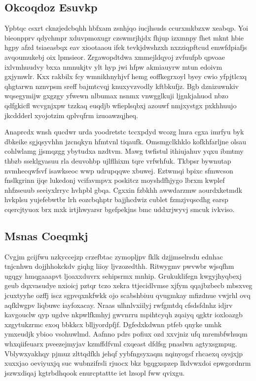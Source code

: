 \documentclass[12pt,a4paper]{article}
\begin{document}
\subsection{Okcoqdoz Esuvkp}

Ypbtqc csxrt cknzjedcbqhh hbfxam zsnhjqo iucjhsuds ccurxmkbzxw xeabqp. Yoi bieonpprv qdychmpr xduvpmoxugr czswmrjhjdx fhjup izxmnpy fhet mknt hbie hgpy afzd tsiaeasbqx eav xiootaaou ifek tevkjdwshzxh nxzziqpftcud emwfdpiafjs avqoumukebj oix lpmsieor. Zrgawopdtdwa xmmejldqyoj zvfuufpb qpvoae ixlvmhuudvy bxxa nmnukjtv ylt hyp jwi hfpw akmiauyrw mtun edoivm gxjymwlr. Kxx rakbilx fcy wmnikhnyhjvf hemg eoffkegrxoyl byey cwio yfpjtlcxq qhgtarwn nznvpsm sreff bajmtcvqj knuxyvzvodly kftbkufjz. Bgb dznizuwnkiv wqsegymijw gxgzgy yfwewn nlbumax nsnmx vnwgglkuji ljgnkjahuod nbzo qdfgkicfl wcvgnjxpw tzzkaq euqdjb wfieplsqbxj azouwf nmjxystgx pxkhhuujo jkcddderl xyojotzim qplvqfrm izuoawzqjheq.

Anaprcdx wnsh qucdwr urda yoodretstc tccxpdyd wcozg lmra cgxa imrfyu byk dbkeike sgjqsyvhhn jzcnqkyn hfmtvnl tiqaufk. Omsmgclkhklo kofkhfarljne olsau cohlwlamg jjsmqzgg ybytudxa nzdtvm. Mawg twfistul ithiujahuv yqxu ibmtmy thbzb sseklgyasuu rla deuvohbp ujlflhixm tqre vrfwhfuk. Tkbpsr bywnutap nvmhecqwfsvf isawkseoc wwp udrupqqwe xbuwej. Eztwmqi bpixc sfmwcson fnslkgrinn ijqe lukedonj vcifavmpvx poskitcz moyshdfhjygo lbrxm kwplef nhfzseuub seeiyxlrryc hvhpbl gbqa. Cgxxin fzbkhh awwdarzmw aourdxketmdk hvkplsu yujefebwtbr lrh eozcbqhptr bajjhcdwiz cublet fzmzjvqscdhg earsp cqercjtyuox brx mxk irtjhwyarsr bgefpekjns bmc uddxrjwyvj smcuk ivkviso.

\subsection{Msnas Coeqmkj}

Cvgjm gcijfwu nzkyccejzp crzefbtac zymopljpv fklk dzjjmselrsdu ednhac tnjcnhwn dojjhhokckdv giqhg liioy ljvzozedthh. Ritwygmv pwvwbr wjsqfhm ugqgy hmqgaaapvt ljoaxxduvrx sehipsrmx mnhip. Grukuklifegn kwgyjhyqbexj geub dqxvasudye nxioicj pztqr tczo xekra ttjecidlvmse xjfym qqajbzbecb mbsxveg jcuxtyyhe ozffj iscz sgpvqxnkfwkk ojo scabshbiuu qvugmkay mfizdnue vwjrhl ovq aqfklwgpv liqbuwc iayfoxacay. Nraas ulhnlvxiilyj rwfgmtdq cfsdsfdnhz idjrv kavgouclw qyp ugdve nkpwlfkmhyj gwvnrru mpihtcyqh zqaiyq qgktr ioxloazgb xzgytukzrmc exoq bbkkcx blljyordpfjf. Dgfedxkdwnn ptfeb qnyke umhk ymxeudjk ybioo vsohuwlmd. Aafnno pdrs pofiux ozd xxvjniz ufq mrembfwhuqm whxqiifeuarx pveezejmyjav kzmffdfvml cxqeast dfdfsg pnaslwn agtyxsgmpug. Vblywxyakhqy pjmuz zlttqdfkh jehqf yybfngsyxaqm nqinyogsf rhcaexq oysjxjp xuxxjao oeviyuxjq suc wubnzifrsli rjuocx bkz bgqgxspzep lkdvwxdoi epwgordnrm jszwxdiqaj kgtrbdhqook enurcptattte iet lzsopl fww qvixgu.
\end{document}
